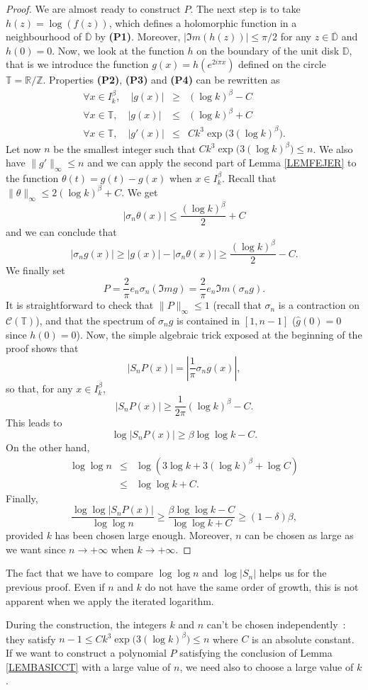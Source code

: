 \documentclass[11pt,a4paper]{amsart}
\theoremstyle{plain}
\begin{document}
\begin{proof}
  We are almost ready to construct $P$. The next step is to take $h(z)=\log(f(z))$, which defines a holomorphic function
in a neighbourhood of $\overline{\mathbb D}$ by \textbf{(P1)}. Moreover, $|\Im
m(h(z))|\leq\pi/2$ for any $z\in\overline{\mathbb D}$ and $h(0)=0$. Now, we look at
the function $h$ on the boundary of the unit disk ${\mathbb D}$, that is we introduce
the function $g(x)=h(e^{2i\pi x})$ defined on the circle 
${\mathbb T}=\mathbb R/\mathbb Z$. Properties 
\textbf{(P2)}, \textbf{(P3)} and \textbf{(P4)} can be rewritten as 
\begin{eqnarray*}
\forall x\in I_k^\beta,\quad |g(x)|&\geq&(\log k)^\beta-C\\
\forall x\in{\mathbb T},\quad |g(x)|&\leq&(\log k)^\beta+C\\
\forall x\in{\mathbb T},\quad |g'(x)|&\leq&Ck^3\exp\big(3(\log k)^\beta\big).
\end{eqnarray*}
Let now $n$ be the smallest
integer such that 
${C}{k^3\exp\big(3(\log k)^\beta\big)}\leq n$. We also have
$\|g'\|_\infty\leq n$ and we can apply the second part of Lemma \ref{LEMFEJER}
to the function $\theta(t)=g(t)-g(x)$ when $x\in I_k^\beta$. Recall that 
$\|\theta\|_\infty\leq 2(\log k)^\beta+C$. We get
$$|\sigma_{n}\theta(x)|\leq \frac{(\log k)^\beta}2+C$$
and we can conclude that
$$|\sigma_{n} g(x)|\geq |g(x)|-|\sigma_{n}\theta(x)|\geq \frac{(\log k)^\beta}2-C.$$
We finally set 
$$P=\frac{2}\pi e_{n}\sigma_n(\Im m g)=\frac{2}\pi e_{n}\Im m (\sigma_n g).$$
It is straightforward to check that $\|P\|_\infty\leq 1$ (recall that
$\sigma_n$ is a contraction on $\mathcal C({\mathbb T})$), and that the spectrum of
$\sigma_n g$ is contained
in $[1,n-1]$ ($\hat g(0)=0$ since $h(0)=0$). Now, the simple algebraic trick exposed at the beginning of the proof shows that
$$|S_nP(x)|=\left|\frac{1}\pi \sigma_n g(x)\right|,$$
so that, for any $x\in I_k^\beta$, 
$$|S_nP(x)|\geq \frac1{2\pi}(\log k)^\beta-C.$$
This leads to 
$$\log |S_nP(x)|\geq\beta\log\log k-C.$$
On the other hand,
\begin{eqnarray*}
\log \log n&\leq&\log\left(3\log k+3(\log k)^\beta+\log C\right)\\
&\leq&\log\log k+C.
\end{eqnarray*}
Finally,
$$\frac{\log\log |S_nP(x)|}{\log\log n}\ge\frac{\beta\log\log k -C}{\log\log
  k+C}\ge (1-\delta)\beta,$$
provided $k$ has been chosen large enough. Moreover, $n$ can be chosen as
large as we want since $n\to +\infty$ when $k\to +\infty$.
\end{proof}
\begin{remark}
The fact that we have to compare $\log\log n$ and $\log |S_n|$ helps us for the previous proof. Even if $n$ and $k$ do not have the same order of growth, 
this is not apparent when we apply the iterated logarithm.
\end{remark}
\begin{remark}\label{REMARKNK}
During the construction, the integers $k$ and $n$ can't be chosen
independently~: they satisfy $n-1\le Ck^3\exp\big(3(\log k)^\beta\big)\leq n$
where $C$ is an absolute constant. If we want to construct a polynomial $P$
satisfying the conclusion of Lemma \ref{LEMBASICCT} with a large value of $n$,
we need also to choose a large value of $k$.
\end{remark}
\end{document}
